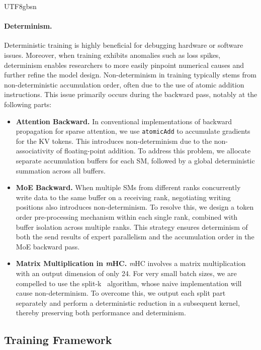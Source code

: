 \documentclass[11pt, a4paper, logo, copyright, nonumbering]{deepseek}
\newcommand{\mhc}{\textit{m}HC}
\begin{document}
\begin{CJK*}{UTF8}{gbsn}
\paragraph{Determinism.}
Deterministic training is highly beneficial for debugging hardware or software issues.
Moreover, when training exhibits anomalies such as loss spikes, determinism enables researchers to more easily pinpoint numerical causes and further refine the model design.
Non-determinism in training typically stems from non-deterministic accumulation order, often due to the use of atomic addition instructions. 
This issue primarily occurs during the backward pass, notably at the following parts:
\begin{itemize}[topsep=0pt]
    \item \textbf{Attention Backward.} 
    In conventional implementations of backward propagation for sparse attention, we use \texttt{atomicAdd} to accumulate gradients for the KV tokens. 
    This introduces non-determinism due to the non-associativity of floating-point addition. 
    To address this problem, we allocate separate accumulation buffers for each SM, followed by a global deterministic summation across all buffers.
    
    \item \textbf{MoE Backward.} 
    When multiple SMs from different ranks concurrently write data to the same buffer on a receiving rank, negotiating writing positions also introduces non-determinism. 
    To resolve this, we design a token order pre-processing mechanism within each single rank, combined with buffer isolation across multiple ranks. 
    This strategy ensures determinism of both the send results of expert parallelism and the accumulation order in the MoE backward pass.

    \item \textbf{Matrix Multiplication in \mhc{}.} 
    \mhc{} involves a matrix multiplication with an output dimension of only 24. 
    For very small batch sizes, we are compelled to use the split-k~\citep{stream_k} algorithm, whose naive implementation will cause non-determinism. 
    To overcome this, we output each split part separately and perform a deterministic reduction in a subsequent kernel, thereby preserving both performance and determinism.
\end{itemize}

\subsection{Training Framework}
\label{subsec:training-framework}


\end{CJK*}
\end{document}
